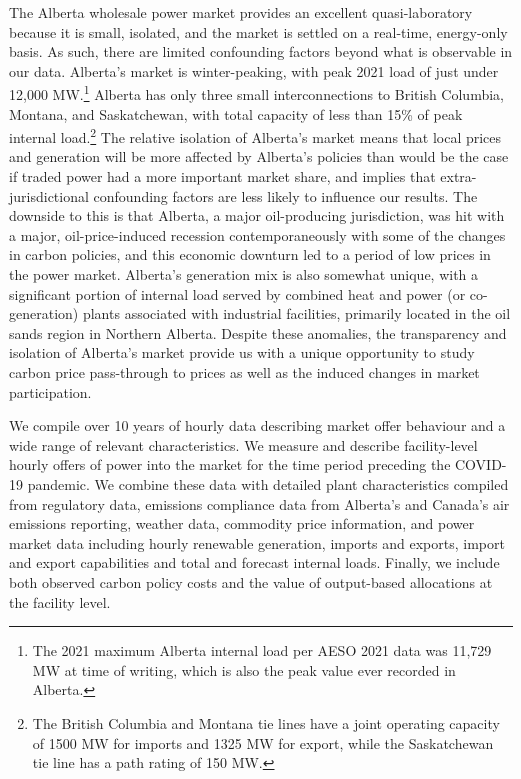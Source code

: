 \documentclass[12pt]{article}
\begin{document}
The Alberta wholesale power market provides an excellent quasi-laboratory because it is small, isolated, and the market is settled on a real-time, energy-only basis. As such, there are limited confounding factors beyond what is observable in our data. Alberta's market is winter-peaking, with peak 2021 load of just under 12,000 MW.\footnote{The 2021 maximum Alberta internal load per AESO 2021 data was 11,729 MW at time of writing, which is also the peak value ever recorded in Alberta.} Alberta has only three small interconnections to British Columbia, Montana, and Saskatchewan, with total capacity of less than 15\% of peak internal load.\footnote{The British Columbia and Montana tie lines have a joint operating capacity of 1500 MW for imports and 1325 MW for export, while the Saskatchewan tie line has a path rating of 150 MW.} The relative isolation of Alberta's market means that local prices and generation will be more affected by Alberta's policies than would be the case if traded power had a more important market share, and implies that extra-jurisdictional confounding factors are less likely to influence our results. The downside to this is that Alberta, a major oil-producing jurisdiction, was hit with a major, oil-price-induced recession contemporaneously with some of the changes in carbon policies, and this economic downturn led to a period of low prices in the power market. Alberta's generation mix is also somewhat unique, with a significant portion of internal load served by combined heat and power (or co-generation) plants associated with industrial facilities, primarily located in the oil sands region in Northern Alberta. Despite these anomalies, the transparency and isolation of Alberta's market provide us with a unique opportunity to study carbon price pass-through to prices as well as the induced changes in market participation.

We compile over 10 years of hourly data describing market offer behaviour and a wide range of relevant characteristics. We measure and describe facility-level hourly offers of power into the market for the time period preceding the COVID-19 pandemic. We combine these data with detailed plant characteristics compiled from regulatory data, emissions compliance data from Alberta's and Canada's air emissions reporting, weather data, commodity price information, and power market data including hourly renewable generation, imports and exports, import and export capabilities and total and forecast internal loads. Finally, we include both observed carbon policy costs and the value of output-based allocations at the facility level.
\end{document}
